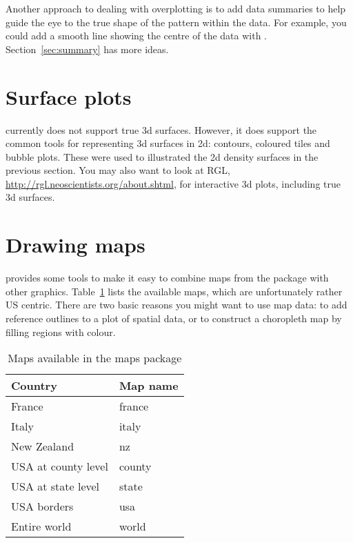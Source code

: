 Another approach to dealing with overplotting is to add data summaries to help guide the eye to the true shape of the pattern within the data.  For example,  you could add a smooth line showing the centre of the data with . Section~\ref{sec:summary} has more ideas.

\section{Surface plots}
\label{sec:surface}

\ggplot currently does not support true 3d surfaces.  However, it does support the common tools for representing 3d surfaces in 2d: contours, coloured tiles and bubble plots.  These were used to illustrated the 2d density surfaces in the previous section.  You may also want to look at RGL, \url{http://rgl.neoscientists.org/about.shtml}, for interactive 3d plots, including true 3d surfaces.  

\section{Drawing maps}
\label{sec:maps}

\ggplot provides some tools to make it easy to combine maps from the  package with other \ggplot graphics.  Table~\ref{tbl:maps} lists the available maps, which are unfortunately rather US centric.  There are two basic reasons you might want to use map data: to add reference outlines to a plot of spatial data, or to construct a choropleth map by filling regions with colour. 

\begin{table}
  \begin{center}
  \begin{tabular}{ll}
    \toprule
    Country & Map name \\
    \midrule
    France & france \\
    Italy & italy \\
    New Zealand & nz \\
    USA at county level & county \\
    USA at state level & state \\
    USA borders & usa \\
    Entire world & world \\ 
    \bottomrule
  \end{tabular}
  \end{center}
  \caption{Maps available in the maps package}
  \label{tbl:maps}
\end{table}

